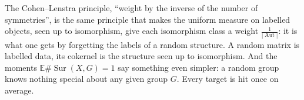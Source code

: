 \begin{beauty}
The Cohen--Lenstra principle, ``weight by the inverse of the number of symmetries'', is the same principle that makes the uniform measure on labelled objects, seen up to isomorphism, give each isomorphism class a weight $\frac1{|\operatorname{Aut}|}$: it is what one gets by forgetting the labels of a random structure. A random matrix is labelled data, its cokernel is the structure seen up to isomorphism. And the moments $\mathbb E\#\operatorname{Sur}(X,G)=1$ say something even simpler: a random group knows nothing special about any given group $G$. Every target is hit once on average.
\end{beauty}
